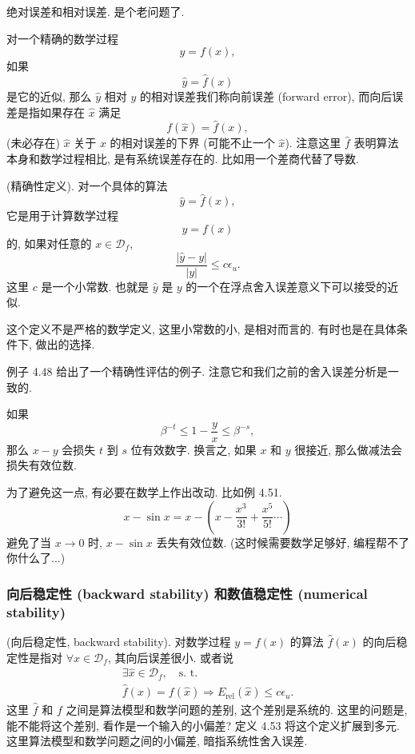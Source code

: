 \documentclass[a4paper]{ctexart}
\begin{document}
 绝对误差和相对误差. 是个老问题了.

 对一个精确的数学过程
$$
y = f(x),
$$
如果
$$
\hat{y} = \hat{f}(x)
$$
是它的近似, 那么 $\hat{y}$ 相对 $y$ 的相对误差我们称向前误差
(forward error), 而向后误差是指如果存在 $\hat{x}$ 满足
$$
f(\hat{x}) = \hat{f}(x),
$$
(未必存在) $\hat{x}$ 关于 $x$ 的相对误差的下界 (可能不止一个 $\hat{x}$).
注意这里 $\hat{f}$ 表明算法本身和数学过程相比, 是有系统误差存在的.
比如用一个差商代替了导数.

 (精确性定义). 对一个具体的算法
$$
\hat{y} = \hat{f}(x),
$$
它是用于计算数学过程
$$
y = f(x)
$$
的, 如果对任意的 $x \in \mathscr{D}_f$,
$$
\frac{|\hat{y} - y|}{|y|} \leq c \epsilon_u.
$$
这里 $c$ 是一个小常数. 也就是 $\hat{y}$ 是 $y$
的一个在浮点舍入误差意义下可以接受的近似.

这个定义不是严格的数学定义, 这里小常数的小, 是相对而言的.
有时也是在具体条件下, 做出的选择.

例子 4.48 给出了一个精确性评估的例子. 注意它和我们之前的舍入误差分析是一致的.

 如果
$$
\beta^{-t} \leq 1 - \frac{y}{x} \leq \beta^{-s},
$$
那么 $x - y$ 会损失 $t$ 到 $s$ 位有效数字. 换言之, 如果 $x$ 和 $y$ 很接近,
那么做减法会损失有效位数.

为了避免这一点, 有必要在数学上作出改动. 比如例 4.51.
$$
x - \sin x = x - \left(x - \frac{x^3}{3!} + \frac{x^5}{5!} \cdots\right)
$$
避免了当 $x \to 0$ 时, $x - \sin x$ 丢失有效位数. (这时候需要数学足够好,
编程帮不了你什么了...)

\subsubsection{向后稳定性 (backward stability) 和数值稳定性 (numerical stability)}

 (向后稳定性, backward stability). 对数学过程 $y = f(x)$
的算法 $\hat{f}(x)$ 的向后稳定性是指对 $\forall x \in \mathscr{D}_f$, 其向后误差很小.
或者说
$$
\begin{array}{l}
  \exists \hat{x} \in \mathscr{D}_f, \quad \mbox{s. t.} \\
  \hat{f}(x) = f(\hat{x}) \Rightarrow E_{\mbox{rel}}(\hat{x}) \leq c \epsilon_u.
\end{array}
$$
这里 $\hat{f}$ 和 $f$ 之间是算法模型和数学问题的差别, 这个差别是系统的. 这里的问题是,
能不能将这个差别, 看作是一个输入的小偏差? 定义 4.53 将这个定义扩展到多元.
这里算法模型和数学问题之间的小偏差, 暗指系统性舍入误差.
\end{document}
